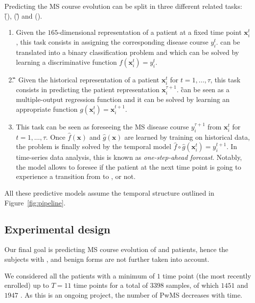 Predicting the MS course evolution can be split in three different related tasks: \f (\F), \g (\G) and \fog (\FOG).

\begin{enumerate}
	\item[] \textbf{\F} Given the $165$-dimensional representation of a patient at a fixed time point $\bm{x}_i^t$, this task consists in assigning the corresponding disease course $y_i^t$. \F can be translated into a binary classification problem and which can be solved by learning a discriminative function $f(\bm{x}_i^{t}) = y_i^{t}$.
	
	\item[] \textbf{\G} Given the historical representation  of a patient $\bm{x}_i^t$ for $t=1,\dots,\tau$, this task consists in predicting the patient representation $\bm{x}_i^{\tau+1}$. \G can be seen as a multiple-output regression function and it can be solved by learning an appropriate function $g(\bm{x}_i^{t}) = \bm{x}_i^{t+1}$.
	
	\item[] \textbf{\FOG} This task can be seen as foreseeing the MS disease course $y_i^{\tau+1}$ from $\bm{x}_i^t$ for $t=1,\dots,\tau$. Once $\hat{f}(\bm{x})$ and $\hat{g}(\bm{x})$ are learned by training on historical \PCO data, the \FOG problem is finally solved by the temporal model $\hat{f} \circ \hat{g}(\bm{x}_i^{t}) = y_i^{t+1}$. In time-series data analysis, this is known as \textit{one-step-ahead forecast}. Notably, the \FOG model allows to foresee if the patient at the next time point is going to experience a transition from \RR to \SP, or not.

\end{enumerate}

All these predictive models assume the temporal structure outlined in Figure~\ref{fig:pipeline}.




\subsection{Experimental design}\label{sec:experimental_design}
Our final goal is predicting MS course evolution of  \RR and  \SP patients, hence the subjects with \PR, \PP and benign forms are not further taken into account.

We considered all the patients with a minimum of $1$ time point (the most recently enrolled) up to $T=11$ time points for a total of $3398$ samples, of which $1451$ \RR and $1947$ \SP. As this is an ongoing project, the number of PwMS decreases with time.

